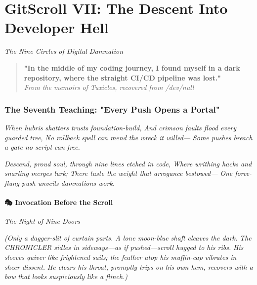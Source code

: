 \chapter{GitScroll VII: The Descent Into Developer Hell}
\label{chap:07-2}

\emph{The Nine Circles of Digital Damnation}

\begin{quote}
\textbf{"In the middle of my coding journey, I found myself in a dark repository, where the straight CI/CD pipeline was lost."}\\
\emph{From the memoirs of Tuxicles, recovered from /dev/null}
\end{quote}

\subsection{The Seventh Teaching: "Every Push Opens a Portal"}\label{the-seventh-teaching-every-push-opens-a-portal}

\emph{When hubris shatters trust\textquotesingle s foundation-build,} \emph{And crimson faults flood every guarded tree,} \emph{No rollback spell can mend the wreck it willed---} \emph{Some pushes breach a gate no script can free.}

\emph{Descend, proud soul, through nine lines etched in code,} \emph{Where writhing hacks and snarling merges lurk;} \emph{There taste the weight that arrogance bestowed---} \emph{One force-flung push unveils damnation\textquotesingle s work.}

\bookdivider

\subsubsection{\texorpdfstring{\textbf{🎭 Invocation Before the Scroll}}{🎭 Invocation Before the Scroll}}\label{performing_arts-invocation-before-the-scroll}

\emph{The Night of Nine Doors}

\emph{(Only a dagger-slit of curtain parts. A lone moon-blue shaft cleaves the dark.} \emph{The CHRONICLER sidles in sideways---as if pushed---scroll hugged to his ribs.} \emph{His sleeves quiver like frightened sails; the feather atop his muffin-cap vibrates in sheer dissent.} \emph{He clears his throat, promptly trips on his own hem, recovers with a bow that looks suspiciously like a flinch.)}


